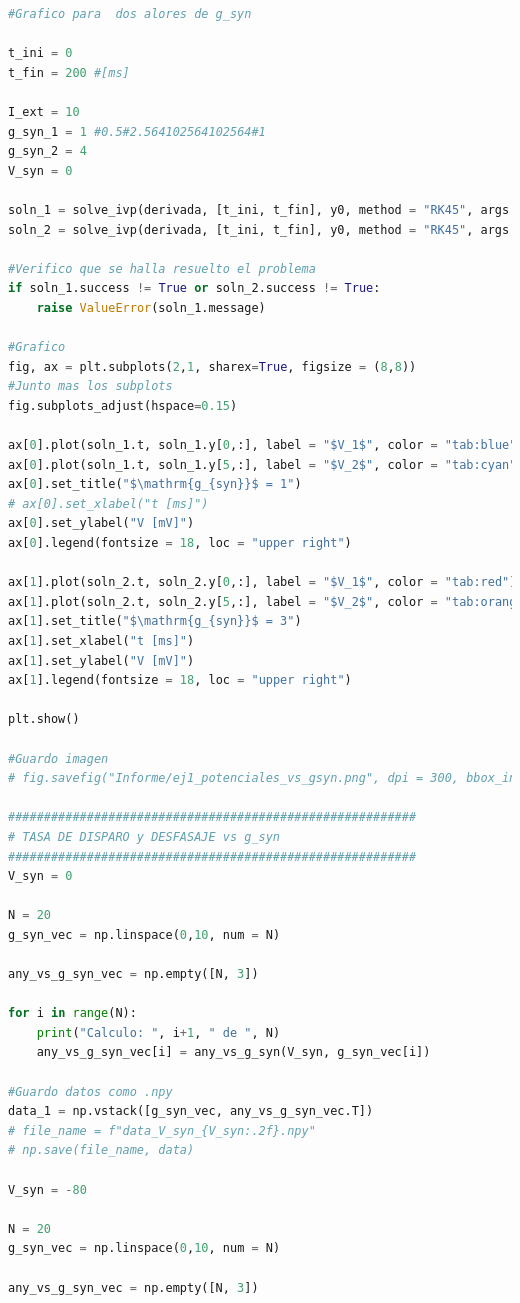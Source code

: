 \documentclass[aps,prb,twocolumn,superscriptaddress,floatfix,longbibliography]{revtex4-2}
\newcounter{para}
\begin{document}
\begin{lstlisting}[language=Python]
#Grafico para  dos alores de g_syn

t_ini = 0
t_fin = 200 #[ms]

I_ext = 10
g_syn_1 = 1 #0.5#2.564102564102564#1
g_syn_2 = 4
V_syn = 0

soln_1 = solve_ivp(derivada, [t_ini, t_fin], y0, method = "RK45", args = (I_ext,g_syn_1,V_syn), dense_output = True)
soln_2 = solve_ivp(derivada, [t_ini, t_fin], y0, method = "RK45", args = (I_ext,g_syn_2,V_syn), dense_output = True)

#Verifico que se halla resuelto el problema
if soln_1.success != True or soln_2.success != True:
    raise ValueError(soln_1.message)

#Grafico
fig, ax = plt.subplots(2,1, sharex=True, figsize = (8,8))
#Junto mas los subplots
fig.subplots_adjust(hspace=0.15)

ax[0].plot(soln_1.t, soln_1.y[0,:], label = "$V_1$", color = "tab:blue")
ax[0].plot(soln_1.t, soln_1.y[5,:], label = "$V_2$", color = "tab:cyan")
ax[0].set_title("$\mathrm{g_{syn}}$ = 1")
# ax[0].set_xlabel("t [ms]")
ax[0].set_ylabel("V [mV]")
ax[0].legend(fontsize = 18, loc = "upper right")

ax[1].plot(soln_2.t, soln_2.y[0,:], label = "$V_1$", color = "tab:red")
ax[1].plot(soln_2.t, soln_2.y[5,:], label = "$V_2$", color = "tab:orange")
ax[1].set_title("$\mathrm{g_{syn}}$ = 3")
ax[1].set_xlabel("t [ms]")
ax[1].set_ylabel("V [mV]")
ax[1].legend(fontsize = 18, loc = "upper right")

plt.show()

#Guardo imagen
# fig.savefig("Informe/ej1_potenciales_vs_gsyn.png", dpi = 300, bbox_inches = "tight")

#########################################################
# TASA DE DISPARO y DESFASAJE vs g_syn
#########################################################
V_syn = 0

N = 20
g_syn_vec = np.linspace(0,10, num = N)

any_vs_g_syn_vec = np.empty([N, 3])

for i in range(N):
    print("Calculo: ", i+1, " de ", N)
    any_vs_g_syn_vec[i] = any_vs_g_syn(V_syn, g_syn_vec[i])

#Guardo datos como .npy
data_1 = np.vstack([g_syn_vec, any_vs_g_syn_vec.T])
# file_name = f"data_V_syn_{V_syn:.2f}.npy"
# np.save(file_name, data)

V_syn = -80

N = 20
g_syn_vec = np.linspace(0,10, num = N)

any_vs_g_syn_vec = np.empty([N, 3])


\end{lstlisting}
\end{document}
